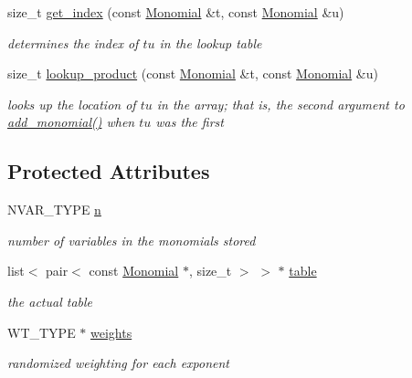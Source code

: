 \begin{DoxyCompactItemize}
size\+\_\+t \hyperlink{class_f4___hash_a12cff698cefa0375ab76ee6c36a0ce6c}{get\+\_\+index} (const \hyperlink{group__polygroup_class_monomial}{Monomial} \&t, const \hyperlink{group__polygroup_class_monomial}{Monomial} \&u)
\begin{DoxyCompactList}\small\item\em determines the index of $tu$ in the lookup table \end{DoxyCompactList}\item 
size\+\_\+t \hyperlink{class_f4___hash_a539f858e09579b9119941795e42cdc4f}{lookup\+\_\+product} (const \hyperlink{group__polygroup_class_monomial}{Monomial} \&t, const \hyperlink{group__polygroup_class_monomial}{Monomial} \&u)
\begin{DoxyCompactList}\small\item\em looks up the location of $tu$ in the array; that is, the second argument to {\ttfamily \hyperlink{class_f4___hash_a86a18244162325e3d792ea39525b23f8}{add\+\_\+monomial()}} when $tu$ was the first \end{DoxyCompactList}\end{DoxyCompactItemize}
\subsection*{Protected Attributes}
\begin{DoxyCompactItemize}
\item 
\mbox{\label{class_f4___hash_ab0d30e19b178ed579bd97fc98c4e3de5}} 
N\+V\+A\+R\+\_\+\+T\+Y\+PE \hyperlink{class_f4___hash_ab0d30e19b178ed579bd97fc98c4e3de5}{n}
\begin{DoxyCompactList}\small\item\em number of variables in the monomials stored \end{DoxyCompactList}\item 
\mbox{\label{class_f4___hash_a80d0b9f0d0f2edb34659b27e2520f083}} 
list$<$ pair$<$ const \hyperlink{group__polygroup_class_monomial}{Monomial} $\ast$, size\+\_\+t $>$ $>$ $\ast$ \hyperlink{class_f4___hash_a80d0b9f0d0f2edb34659b27e2520f083}{table}
\begin{DoxyCompactList}\small\item\em the actual table \end{DoxyCompactList}\item 
\mbox{\label{class_f4___hash_a894a6279c130dd1cdfea12845448e331}} 
W\+T\+\_\+\+T\+Y\+PE $\ast$ \hyperlink{class_f4___hash_a894a6279c130dd1cdfea12845448e331}{weights}
\begin{DoxyCompactList}\small\item\em randomized weighting for each exponent \end{DoxyCompactList}\end{DoxyCompactItemize}
